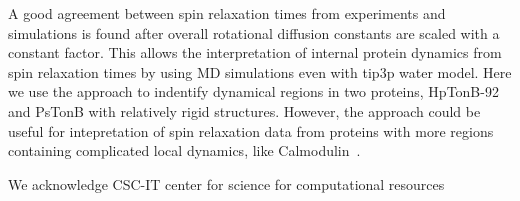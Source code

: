 \documentclass[pre,aps,floatfix,authordate1-4,twocolumn]{revtex4-1}
\begin{document}
A good agreement between spin relaxation times from experiments and simulations is
found after overall rotational diffusion constants are scaled with a constant
factor. This allows the interpretation of internal protein dynamics
from spin relaxation times by using MD simulations even with tip3p water model.
Here we use the approach to indentify dynamical regions in two proteins,
HpTonB-92 and PsTonB with relatively rigid structures. However, the
approach could be useful for intepretation of spin relaxation data from
proteins with more regions containing complicated local dynamics, like
Calmodulin~\cite{barbato92}.


\begin{acknowledgments}
  We acknowledge CSC-IT center for science for computational resources %
\end{acknowledgments}


\end{document}
